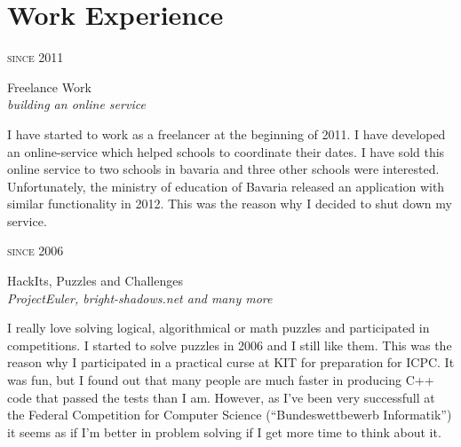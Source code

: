 \documentclass[a4paper,10pt]{article} %
\begin{document}
{%
\begin{minipage}[t]{0.5\textwidth}
\vspace{0pt} %


\section{Work Experience}

{\raggedleft\textsc{since 2011}\par}

{\raggedright\large Freelance Work\\
\textit{building an online service}\\[5pt]}

\normalsize{I have started to work as a freelancer at the beginning
of 2011. I have developed an online-service which helped
schools to coordinate their dates. I have sold this online service to
two schools in bavaria and three other schools were interested.
Unfortunately, the ministry of education of Bavaria
released an application with similar functionality in
2012. This was the reason why I decided to shut down my service.}\\

{\raggedleft\textsc{since 2006}\par}

{\raggedright\large HackIts, Puzzles and Challenges\\
\textit{ProjectEuler, bright-shadows.net and many more}\\[5pt]}

\normalsize{I really love solving logical, algorithmical or math
puzzles and participated in competitions. I started to solve puzzles
in 2006 and I still like them. This was the reason why I participated
in a practical curse at KIT for preparation for ICPC. It was fun,
but I found out that many people are much faster in producing C++
code that passed the tests than I am.
However, as I've been very successfull at the Federal Competition for
Computer Science (``Bundeswettbewerb Informatik'') it seems as if I'm
better in problem solving if I get more time to think about it.}\\


\end{minipage}}
\end{document}
